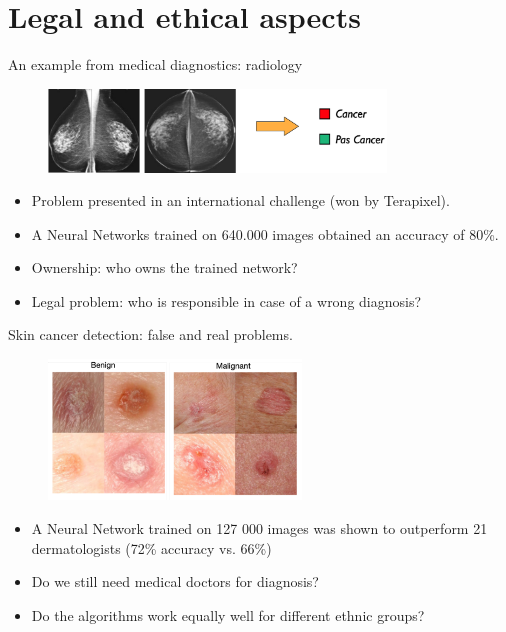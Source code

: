 \documentclass[xcolor=pdftex,dvipsnames,table]{beamer}
\begin{document}
\section{Legal and ethical aspects}
\begin{frame}{An example from  medical diagnostics: radiology}
\begin{figure}[htb]
\includegraphics[width=0.8\textwidth]{../graphics/radiology.pdf}
\end{figure}

\begin{itemize}
\item<1-> Problem presented in an international challenge (won by Terapixel). 
\item<2-> A Neural Networks trained on 640.000 images obtained an accuracy of 80\%. \
\item<3-> Ownership: who owns the trained network? 
\item<4-> Legal problem: who is responsible in case of a wrong diagnosis? 
\end{itemize}
\end{frame}

\begin{frame}{Skin cancer detection: false and real problems.}
\begin{figure}[htb]
\includegraphics[width=0.6\textwidth]{../graphics/dermatology.pdf}
\end{figure}
\begin{itemize}
\item<1-> A Neural Network trained on 127 000 images was shown to outperform 21 dermatologists (72\% accuracy vs. 66\%) \cite{Esteva2017} 
\item<2-> Do we still need medical doctors for diagnosis? 
\item<3-> Do the algorithms work equally well for different ethnic groups? 
\end{itemize}
\end{frame}
\end{document}
